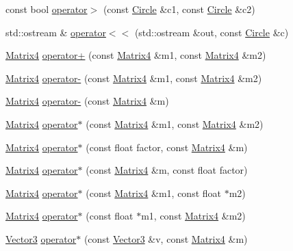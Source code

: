 \begin{DoxyCompactItemize}
const bool \hyperlink{namespaceprism_a671739ac8567654dba563c34af92213f}{operator$>$} (const \hyperlink{classprism_1_1_circle}{Circle} \&c1, const \hyperlink{classprism_1_1_circle}{Circle} \&c2)
\item 
std\+::ostream \& \hyperlink{namespaceprism_aa63d3d39d3fad8fa5c5966cc4f306324}{operator$<$$<$} (std\+::ostream \&out, const \hyperlink{classprism_1_1_circle}{Circle} \&c)
\item 
\hyperlink{classprism_1_1_matrix4}{Matrix4} \hyperlink{namespaceprism_a33537d30f01f996f8a05fc5b1b49ba3b}{operator+} (const \hyperlink{classprism_1_1_matrix4}{Matrix4} \&m1, const \hyperlink{classprism_1_1_matrix4}{Matrix4} \&m2)
\item 
\hyperlink{classprism_1_1_matrix4}{Matrix4} \hyperlink{namespaceprism_a34a2f64f209065f753bed62a880b75b6}{operator-\/} (const \hyperlink{classprism_1_1_matrix4}{Matrix4} \&m1, const \hyperlink{classprism_1_1_matrix4}{Matrix4} \&m2)
\item 
\hyperlink{classprism_1_1_matrix4}{Matrix4} \hyperlink{namespaceprism_a879d3410d690b5722a9af17297f38fbb}{operator-\/} (const \hyperlink{classprism_1_1_matrix4}{Matrix4} \&m)
\item 
\hyperlink{classprism_1_1_matrix4}{Matrix4} \hyperlink{namespaceprism_a9ae44fb46bb709a5c8f4d592baf65522}{operator$\ast$} (const \hyperlink{classprism_1_1_matrix4}{Matrix4} \&m1, const \hyperlink{classprism_1_1_matrix4}{Matrix4} \&m2)
\item 
\hyperlink{classprism_1_1_matrix4}{Matrix4} \hyperlink{namespaceprism_ab3639f7bd46a54726522dfe406841ea9}{operator$\ast$} (const float factor, const \hyperlink{classprism_1_1_matrix4}{Matrix4} \&m)
\item 
\hyperlink{classprism_1_1_matrix4}{Matrix4} \hyperlink{namespaceprism_a4073983f089695c40b6fd20d892175f9}{operator$\ast$} (const \hyperlink{classprism_1_1_matrix4}{Matrix4} \&m, const float factor)
\item 
\hyperlink{classprism_1_1_matrix4}{Matrix4} \hyperlink{namespaceprism_aa2859acb8e8dd6fea8678e14249e561d}{operator$\ast$} (const \hyperlink{classprism_1_1_matrix4}{Matrix4} \&m1, const float $\ast$m2)
\item 
\hyperlink{classprism_1_1_matrix4}{Matrix4} \hyperlink{namespaceprism_a5e83bcd69595728106bed838aeb32f70}{operator$\ast$} (const float $\ast$m1, const \hyperlink{classprism_1_1_matrix4}{Matrix4} \&m2)
\item 
\hyperlink{classprism_1_1_vector3}{Vector3} \hyperlink{namespaceprism_a95ceb3342a808c88d0bb7c1f7e0ef82b}{operator$\ast$} (const \hyperlink{classprism_1_1_vector3}{Vector3} \&v, const \hyperlink{classprism_1_1_matrix4}{Matrix4} \&m)

\end{DoxyCompactItemize}
